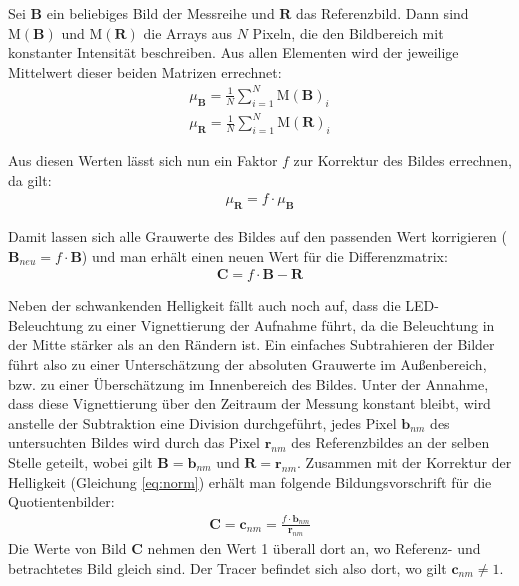 Sei $\mathbf{B}$ ein beliebiges Bild der Messreihe und $\mathbf{R}$ das Referenzbild. Dann sind 
$\mathrm{M(\mathbf{B})}$ und $\mathrm{M(\mathbf{R})}$ die Arrays aus $N$ Pixeln, die den Bildbereich mit konstanter Intensität beschreiben. Aus allen Elementen 
wird der jeweilige Mittelwert dieser beiden Matrizen errechnet:
\begin{eqnarray}
 \mu_{\mathbf{B}} = \frac{1}{N} \sum_{i=1}^N \mathrm{M(\mathbf{B})}_i \\
 \mu_{\mathbf{R}} = \frac{1}{N} \sum_{i=1}^N \mathrm{M(\mathbf{R})}_i
\end{eqnarray}

Aus diesen Werten lässt sich nun ein Faktor $f$ zur Korrektur des Bildes errechnen, da gilt:
\begin{eqnarray}
 \mu_{\mathbf{R}} = f \cdot \mu_{\mathbf{B}}
 \label{eq:norm}
\end{eqnarray}

Damit lassen sich alle Grauwerte des Bildes auf den passenden Wert korrigieren ($\mathbf{B}_{neu} = f \cdot \mathbf{B}$) und man erhält einen neuen Wert für die 
Differenzmatrix:
\begin{eqnarray}
 \mathbf{C} = f \cdot \mathbf{B} - \mathbf{R}
\end{eqnarray}


Neben der schwankenden Helligkeit fällt auch noch auf, dass die LED-Beleuchtung zu einer Vignettierung der Aufnahme führt, da die Beleuchtung in der Mitte stärker als an den Rändern ist. Ein einfaches Subtrahieren der Bilder führt also zu einer Unterschätzung der absoluten Grauwerte im Außenbereich, bzw. zu einer Überschätzung im Innenbereich des Bildes.
Unter der Annahme, dass diese Vignettierung über den Zeitraum der Messung konstant bleibt, wird anstelle der Subtraktion eine Division durchgeführt, \dah jedes Pixel $\mathbf{b}_{nm}$ des untersuchten Bildes wird durch das Pixel $\mathbf{r}_{nm}$ des Referenzbildes an der selben Stelle geteilt, wobei gilt $\mathbf{B} = \mathbf{b}_{nm}$ und $\mathbf{R} = \mathbf{r}_{nm}$. Zusammen mit der Korrektur der Helligkeit (Gleichung \ref{eq:norm}) erhält man folgende Bildungsvorschrift für die Quotientenbilder:
\begin{eqnarray}
 \mathbf{C} = \mathbf{c}_{nm} = \frac{f \cdot \mathbf{b}_{nm}}{\mathbf{r}_{nm}}
 \label{eq:quot}
\end{eqnarray}
Die Werte von Bild $\mathbf{C}$ nehmen den Wert 1 überall dort an, wo Referenz- und betrachtetes Bild gleich sind. Der Tracer befindet sich also dort, wo gilt 
$\mathbf{c}_{nm} \neq 1$.

